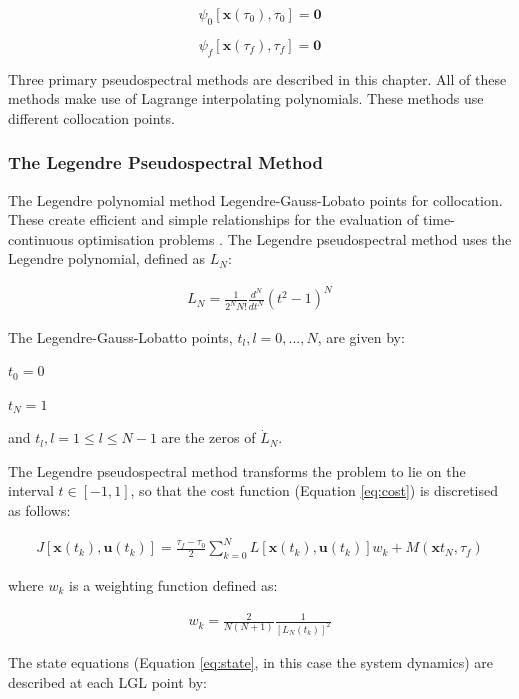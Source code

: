 \begin{equation}
\psi_0[\textbf{x}(\tau_0), \tau_0] = \textbf{0}
\end{equation}

\begin{equation} \label{eq:2}
\psi_f[\textbf{x}(\tau_f), \tau_f] = \textbf{0}
\end{equation}

Three primary pseudospectral methods are described in this chapter. All of these methods make use of Lagrange interpolating polynomials. These methods use different collocation points.


\subsubsection{The Legendre Pseudospectral Method}

The Legendre polynomial method\cite{Fahroo1999} Legendre-Gauss-Lobato points for collocation. These create efficient and simple relationships for the evaluation of time-continuous optimisation problems \cite{Fahroo2000}. 
The Legendre  pseudospectral method uses the Legendre polynomial, defined as $L_N$:

\begin{eqnarray}
L_N = \frac{1}{2^N N!} \frac{d^N}{dt^N}(t^2-1)^N
\end{eqnarray}

The Legendre-Gauss-Lobatto points, $t_l, l=0,...,N$, are given by:

$t_0 = 0$

$t_N = 1$

and $t_l, l=1\leq l \leq N-1$ are the zeros of $\dot{L}_N$.

The Legendre pseudospectral method transforms the problem to lie on the interval $t \in [-1,1]$, so that the cost function  (Equation \ref{eq:cost}) is discretised as follows:

\begin{eqnarray}
J[\textbf{x}(t_k),\textbf{u}(t_k)] = \frac{\tau_f - \tau_0}{2} \sum_{k=0}^{N}L[\textbf{x}(t_k),\textbf{u}(t_k)]w_k + M(\textbf{x}t_N,\tau_f)
\end{eqnarray}

where $ w_k $ is a weighting function defined as:

\begin{eqnarray}
w_k = \frac{2}{N(N+1)} \frac{1}{[L_N(t_k)]^2}
\end{eqnarray}

The state equations (Equation \ref{eq:state}, in this case the system dynamics) are described at each LGL point by:

